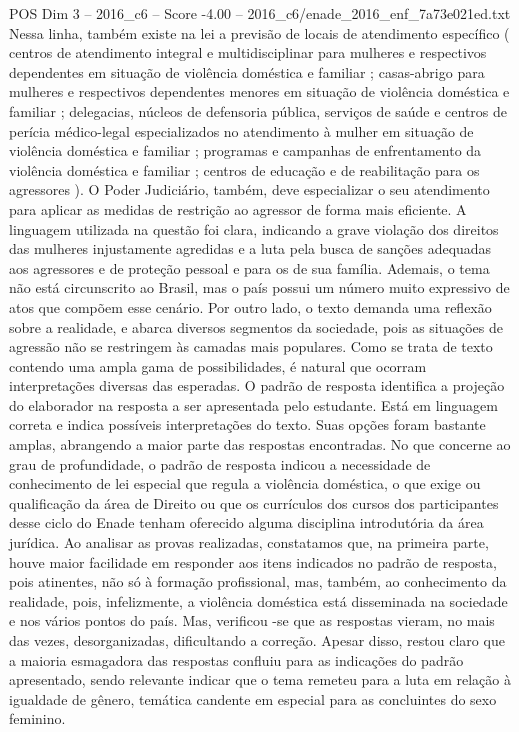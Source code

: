 \begin{textsample}{POS Dim 3 – 2016\_c6 – Score -4.00 – 2016\_c6/enade\_2016\_enf\_7a73e021ed.txt}
Nessa linha, também existe na lei a previsão de locais de atendimento específico ( centros de atendimento integral e multidisciplinar para mulheres e respectivos dependentes em situação de violência doméstica e familiar ; casas-abrigo para mulheres e respectivos dependentes menores em situação de violência doméstica e familiar ; delegacias, núcleos de defensoria pública, serviços de saúde e centros de perícia médico-legal especializados no atendimento à mulher em situação de violência doméstica e familiar ; programas e campanhas de enfrentamento da violência doméstica e familiar ; centros de educação e de reabilitação para os agressores ).
O Poder Judiciário, também, deve especializar o seu atendimento para aplicar as medidas de restrição ao agressor de forma mais eficiente.
A linguagem utilizada na questão foi clara, indicando a grave violação dos direitos das mulheres injustamente agredidas e a luta pela busca de sanções adequadas aos agressores e de proteção pessoal e para os de sua família.
Ademais, o tema não está circunscrito ao Brasil, mas o país possui um número muito expressivo de atos que compõem esse cenário.
Por outro lado, o texto demanda uma reflexão sobre a realidade, e abarca diversos segmentos da sociedade, pois as situações de agressão não se restringem às camadas mais populares.
Como se trata de texto contendo uma ampla gama de possibilidades, é natural que ocorram interpretações diversas das esperadas.
O padrão de resposta identifica a projeção do elaborador na resposta a ser apresentada pelo estudante.
Está em linguagem correta e indica possíveis interpretações do texto.
Suas opções foram bastante amplas, abrangendo a maior parte das respostas encontradas.
No que concerne ao grau de profundidade, o padrão de resposta indicou a necessidade de conhecimento de lei especial que regula a violência doméstica, o que exige ou qualificação da área de Direito ou que os currículos dos cursos dos participantes desse ciclo do Enade tenham oferecido alguma disciplina introdutória da área jurídica.
Ao analisar as provas realizadas, constatamos que, na primeira parte, houve maior facilidade em responder aos itens indicados no padrão de resposta, pois atinentes, não só à formação profissional, mas, também, ao conhecimento da realidade, pois, infelizmente, a violência doméstica está disseminada na sociedade e nos vários pontos do país.
Mas, verificou -se que as respostas vieram, no mais das vezes, desorganizadas, dificultando a correção.
Apesar disso, restou claro que a maioria esmagadora das respostas confluiu para as indicações do padrão apresentado, sendo relevante indicar que o tema remeteu para a luta em relação à igualdade de gênero, temática candente em especial para as concluintes do sexo feminino.

\end{textsample}
